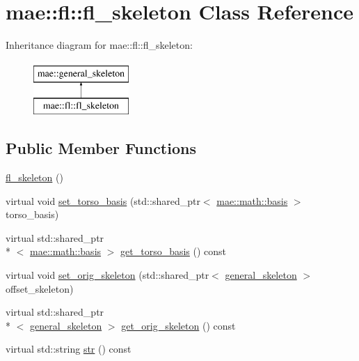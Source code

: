 \hypertarget{classmae_1_1fl_1_1fl__skeleton}{\section{mae\-:\-:fl\-:\-:fl\-\_\-skeleton Class Reference}
\label{classmae_1_1fl_1_1fl__skeleton}
}
Inheritance diagram for mae\-:\-:fl\-:\-:fl\-\_\-skeleton\-:\begin{figure}[H]
\begin{center}
\leavevmode
\includegraphics[height=2.000000cm]{classmae_1_1fl_1_1fl__skeleton}
\end{center}
\end{figure}
\subsection*{Public Member Functions}
\begin{DoxyCompactItemize}
\item 
\hyperlink{classmae_1_1fl_1_1fl__skeleton_ac6aa84119ffc3503a1176bbfdf839b76}{fl\-\_\-skeleton} ()
\item 
virtual void \hyperlink{classmae_1_1fl_1_1fl__skeleton_a4dc318fab1376fd9622808f627353f8e}{set\-\_\-torso\-\_\-basis} (std\-::shared\-\_\-ptr$<$ \hyperlink{classmae_1_1math_1_1basis}{mae\-::math\-::basis} $>$ torso\-\_\-basis)
\item 
virtual std\-::shared\-\_\-ptr\\*
$<$ \hyperlink{classmae_1_1math_1_1basis}{mae\-::math\-::basis} $>$ \hyperlink{classmae_1_1fl_1_1fl__skeleton_ad6c54f3187f2497f5f33200baf7e65d1}{get\-\_\-torso\-\_\-basis} () const 
\item 
virtual void \hyperlink{classmae_1_1fl_1_1fl__skeleton_a59ee34f7cf3bff5c97740def6aaa47cb}{set\-\_\-orig\-\_\-skeleton} (std\-::shared\-\_\-ptr$<$ \hyperlink{classmae_1_1general__skeleton}{general\-\_\-skeleton} $>$ offset\-\_\-skeleton)
\item 
virtual std\-::shared\-\_\-ptr\\*
$<$ \hyperlink{classmae_1_1general__skeleton}{general\-\_\-skeleton} $>$ \hyperlink{classmae_1_1fl_1_1fl__skeleton_a69891a8e74b69088706623e671ac0db0}{get\-\_\-orig\-\_\-skeleton} () const 
\item 
virtual std\-::string \hyperlink{classmae_1_1fl_1_1fl__skeleton_ad759f12bd33a9b0fd801eab2018c64de}{str} () const 
\end{DoxyCompactItemize}
